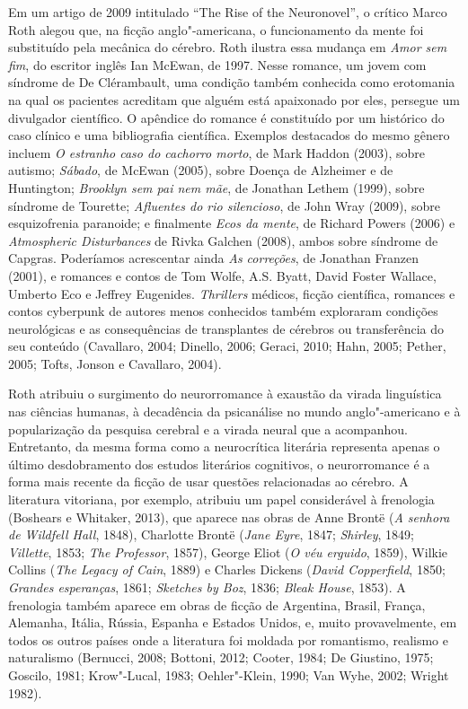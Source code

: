 Em um artigo de 2009 intitulado ``The Rise of the Neuronovel'', o
crítico Marco Roth alegou que, na ficção anglo"-americana, o
funcionamento da mente foi substituído pela mecânica do cérebro. Roth
ilustra essa mudança em \emph{Amor sem fim}, do escritor inglês Ian
McEwan, de 1997. Nesse romance, um jovem com síndrome de De Clérambault,
uma condição também conhecida como erotomania na qual os pacientes
acreditam que alguém está apaixonado por eles, persegue um divulgador
científico. O apêndice do romance é constituído por um histórico do caso
clínico e uma bibliografia científica. Exemplos destacados do mesmo
gênero incluem \emph{O estranho caso do cachorro morto}, de Mark Haddon
(2003), sobre autismo; \emph{Sábado}, de McEwan (2005), sobre Doença de
Alzheimer e de Huntington; \emph{Brooklyn sem pai nem mãe}, de Jonathan
Lethem (1999), sobre síndrome de Tourette; \emph{Afluentes do rio
silencioso}, de John Wray (2009), sobre esquizofrenia paranoide; e
finalmente \emph{Ecos da mente}, de Richard Powers (2006) e
\emph{Atmospheric Disturbances} de Rivka Galchen (2008), ambos sobre
síndrome de Capgras. Poderíamos acrescentar ainda \emph{As correções},
de Jonathan Franzen (2001), e romances e contos de Tom Wolfe, A.S.
Byatt, David Foster Wallace, Umberto Eco e Jeffrey Eugenides.
\emph{Thrillers} médicos, ficção científica, romances e contos cyberpunk
de autores menos conhecidos também exploraram condições neurológicas e
as consequências de transplantes de cérebros ou transferência do seu
conteúdo (Cavallaro, 2004; Dinello, 2006; Geraci, 2010; Hahn, 2005;
Pether, 2005; Tofts, Jonson e Cavallaro, 2004).

Roth atribuiu o surgimento do neurorromance à exaustão da virada
linguística nas ciências humanas, à decadência da psicanálise no mundo
anglo"-americano e à popularização da pesquisa cerebral e a virada neural
que a acompanhou. Entretanto, da mesma forma como a neurocrítica
literária representa apenas o último desdobramento dos estudos
literários cognitivos, o neurorromance é a forma mais recente da ficção
de usar questões relacionadas ao cérebro. A literatura vitoriana, por
exemplo, atribuiu um papel considerável à frenologia (Boshears e
Whitaker, 2013), que aparece nas obras de Anne Brontë (\emph{A senhora
de Wildfell Hall}, 1848), Charlotte Brontë (\emph{Jane Eyre}, 1847;
\emph{Shirley}, 1849; \emph{Villette}, 1853; \emph{The Professor},
1857), George Eliot (\emph{O véu erguido}, 1859), Wilkie Collins
(\emph{The Legacy of Cain}, 1889) e Charles Dickens (\emph{David
Copperfield}, 1850; \emph{Grandes esperanças}, 1861; \emph{Sketches by
Boz}, 1836; \emph{Bleak House}, 1853). A frenologia também aparece em
obras de ficção de Argentina, Brasil, França, Alemanha, Itália, Rússia,
Espanha e Estados Unidos, e, muito provavelmente, em todos os outros
países onde a literatura foi moldada por romantismo, realismo e
naturalismo (Bernucci, 2008; Bottoni, 2012; Cooter, 1984; De Giustino,
1975; Goscilo, 1981; Krow"-Lucal, 1983; Oehler"-Klein, 1990; Van Wyhe,
2002; Wright 1982).

